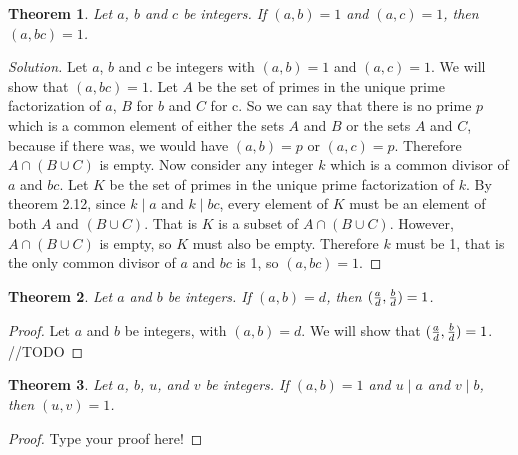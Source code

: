 \documentclass[12pt,leqno]{article}
\numberwithin{equation}{section}
\newtheorem{thm}{Theorem}[section]
\theoremstyle{definition}
\begin{document}

\begin{thm}
Let $a$, $b$ and $c$ be integers.  If $(a, b) = 1$ and $(a, c) = 1$, then \\$(a, bc) = 1$.
\end{thm}

\begin{proof}[Solution]
Let $a$, $b$ and $c$ be integers with $(a, b) = 1$ and $(a, c) = 1$. We will show that $(a, bc) = 1$.  Let $A$ be the set of primes in the unique prime factorization of $a$, $B$ for $b$ and $C$ for c.  So we can say that there is no prime $p$ which is a common element of either the sets $A$ and $B$ or the sets $A$ and $C$, because if there was, we would have $(a, b) = p$ or $(a, c) = p$.  Therefore $A \cap (B \cup C)$ is empty.  Now consider any integer $k$ which is a common divisor of $a$ and $bc$.  Let $K$ be the set of primes in the unique prime factorization of $k$.  By theorem 2.12, since $k \mid a$ and $k \mid bc$, every element of $K$ must be an element of both $A$ and $(B \cup C)$.  That is $K$ is a subset of $A \cap (B \cup C)$.  However, $A \cap (B \cup C)$ is empty, so $K$ must also be empty.  Therefore $k$ must be 1, that is the only common divisor of $a$ and $bc$ is 1, so $(a, bc) = 1$.
\end{proof}


\begin{thm}
Let $a$ and $b$ be integers.  If $(a, b) = d$, then $({a \over d}, {b \over d}) = 1$.
\end{thm}

\begin{proof}[Proof]
Let $a$ and $b$ be integers, with $(a, b) = d$. We will show that $({a \over d}, {b \over d}) = 1$.  //TODO
\end{proof}


\begin{thm}
Let $a$, $b$, $u$, and $v$ be integers.  If $(a, b) = 1$ and $u \mid a$ and $v \mid b$, then $(u, v) = 1$.
\end{thm}

\begin{proof}[Proof]
Type your proof here!
\end{proof}
\end{document}
